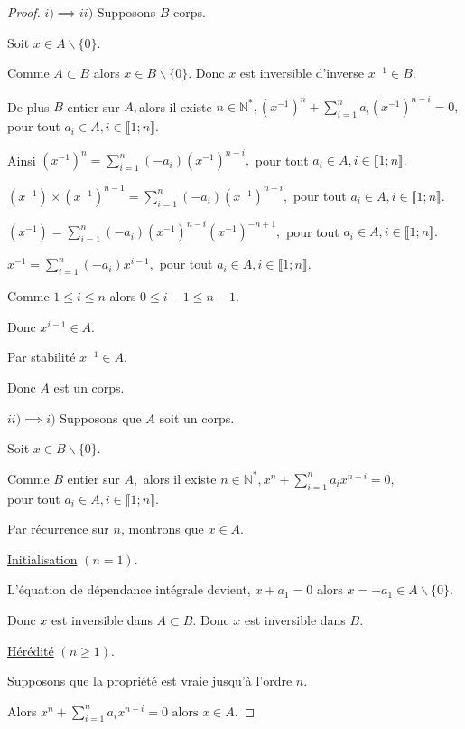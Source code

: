 \begin{proof}
	$i)\implies ii)$ Supposons $B$ corps.
	
	Soit $x\in A\backslash \{0\}.$
	
	Comme $A\subset B$ alors $x\in B\backslash \{0\}$. Donc $x$ est inversible d'inverse $x^{-1}\in B.$
	
	De plus $B$ entier sur $A,$alors il existe $n\in \mathbb{N}^{\ast },(x^{-1})^{n}+\sum\limits_{i=1}^{n}a_{i}(x^{-1})^{n-i}=0,$ pour tout 
	$a_{i}\in A,i\in \llbracket 1; n \rrbracket.$
	
	Ainsi $(x^{-1})^{n}=\sum\limits_{i=1}^{n}(-a_{i})(x^{-1})^{n-i},$ pour tout $
	a_{i}\in A,i\in \llbracket 1; n \rrbracket.$
	
	$(x^{-1})\times (x^{-1})^{n-1}=\sum\limits_{i=1}^{n}(-a_{i})(x^{-1})^{n-i},$
	pour tout $a_{i}\in A,i\in \llbracket 1; n \rrbracket.$
	
	$(x^{-1})=\sum\limits_{i=1}^{n}(-a_{i})(x^{-1})^{n-i}(x^{-1})^{-n+1},$ pour
	tout $a_{i}\in A,i\in \llbracket 1; n \rrbracket.$
	
	$x^{-1}=\sum\limits_{i=1}^{n}(-a_{i})x^{i-1},$ pour tout $a_{i}\in A,i\in
	\llbracket 1; n \rrbracket.$
	
	Comme $1\leq i\leq n$ alors $0\leq i-1\leq n-1$.
	
	Donc $x^{i-1}\in A$.
	
	Par stabilité $x^{-1}\in A$.
	
	Donc $A$ est un corps.
	
	$ii)\implies i)$ Supposons que $A$ soit un corps.
	
	Soit $x\in B\backslash \{0\}.$
	
	Comme $B$ entier sur $A,$ alors il existe $n\in \mathbb{N}^{\ast },x^{n}+\sum\limits_{i=1}^{n}a_{i}x^{n-i}=0,$\\ pour tout $a_{i}\in
	A,i\in \llbracket 1; n \rrbracket.$

	Par récurrence sur $n$, montrons que $x\in A.$
	
	\underline{Initialisation} $(n=1)$.
	
	L'équation de dépendance intégrale devient, $x+a_{1}=0
	\text{ alors } x=-a_{1}\in A\backslash \{0\}.$
	
	Donc $x$ est inversible dans $A\subset B.$ Donc $x$ est inversible dans $B.$
	
	\underline{Hérédité} $(n\geq 1)$.
	
	Supposons que la propriété est vraie jusqu'à l'ordre $n.$
	
	Alors $x^{n}+\sum\limits_{i=1}^{n}a_{i}x^{n-i}=0\text{ alors } x\in A.$
	

\end{proof}

